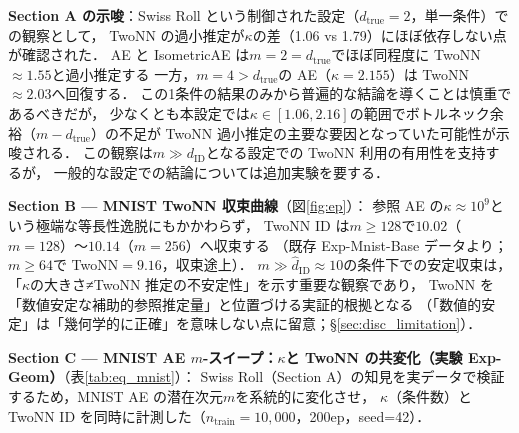 \documentclass[11pt,a4paper]{jsarticle}
\newcommand{\kap}{\kappa}
\begin{document}
\textbf{Section A の示唆}：Swiss Roll という制御された設定（$d_\mathrm{true}=2$，単一条件）での観察として，
TwoNN の過小推定が$\kap$の差（1.06 vs 1.79）にほぼ依存しない点が確認された．
AE と IsometricAE は$m=2=d_\mathrm{true}$でほぼ同程度に TwoNN$\approx1.55$と過小推定する
一方，$m=4>d_\mathrm{true}$の AE（$\kap=2.155$）は TwoNN$\approx2.03$へ回復する．
この1条件の結果のみから普遍的な結論を導くことは慎重であるべきだが，
少なくとも本設定では$\kap \in [1.06, 2.16]$の範囲でボトルネック余裕（$m - d_\mathrm{true}$）の不足が
TwoNN 過小推定の主要な要因となっていた可能性が示唆される．
この観察は$m \gg d_\mathrm{ID}$となる設定での TwoNN 利用の有用性を支持するが，
一般的な設定での結論については追加実験を要する．

\textbf{Section B — MNIST TwoNN 収束曲線}（図\ref{fig:ep}）：
参照 AE の$\kap \approx 10^9$という極端な等長性逸脱にもかかわらず，
TwoNN ID は$m \geq 128$で$10.02$（$m=128$）〜$10.14$（$m=256$）へ収束する
（既存 Exp-Mnist-Base データより；$m \geq 64$で TwoNN$=9.16$，収束途上）．
$m \gg \hat{d}_\mathrm{ID} \approx 10$の条件下での安定収束は，
「$\kap$の大きさ≠TwoNN 推定の不安定性」を示す重要な観察であり，
TwoNN を「数値安定な補助的参照推定量」と位置づける実証的根拠となる
（「数値的安定」は「幾何学的に正確」を意味しない点に留意；§\ref{sec:disc_limitation}）．

\textbf{Section C — MNIST AE $m$-スイープ：$\kappa$と TwoNN の共変化（実験 Exp-Geom）}（表\ref{tab:eq_mnist}）：
Swiss Roll（Section A）の知見を実データで検証するため，MNIST AE の潜在次元$m$を系統的に変化させ，
$\kap$（条件数）と TwoNN ID を同時に計測した（$n_\mathrm{train}=10{,}000$，200ep，seed=42）．
\end{document}
